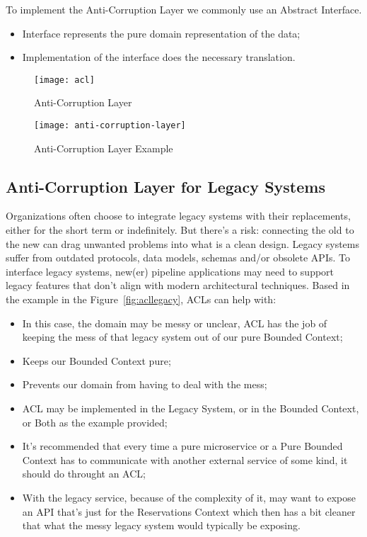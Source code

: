 To implement the Anti-Corruption Layer we commonly use an Abstract Interface.
\begin{itemize}
    \item Interface represents the pure domain representation of the data;
    \item Implementation of the interface does the necessary translation.
\end{itemize}

\begin{figure}[ht]
\caption{Anti-Corruption Layer}
\centering
\texttt{[image: acl]}
 \label{fig:acl}
\end{figure}


\begin{figure}[ht]
\caption{Anti-Corruption Layer Example}
\centering
\texttt{[image: anti-corruption-layer]}
 \label{fig:aclfull}
\end{figure}

\subsection{Anti-Corruption Layer for Legacy Systems}

Organizations often choose to integrate legacy systems with their replacements, either for the short term or indefinitely. But there's a risk: connecting the old to the new can drag unwanted problems into what is a clean design. Legacy systems suffer from outdated protocols, data models, schemas and/or obsolete APIs. To interface legacy systems, new(er) pipeline applications may need to support legacy features that don't align with modern architectural techniques. Based in the example in the Figure~\ref{fig:acllegacy}, ACLs can help with:
\begin{itemize}
    \item In this case, the domain may be messy or unclear, ACL has the job of keeping the mess of that legacy system out of our pure Bounded Context;
    \item Keeps our Bounded Context pure;
    \item Prevents our domain from having to deal with the mess;
    \item ACL may be implemented in the Legacy System, or in the Bounded Context, or Both as the example provided;
    \item It's recommended that every time a pure microservice or a Pure Bounded Context has to communicate with another external service of some kind, it should do throught an ACL;
    \item With the legacy service, because of the complexity of it, may want to expose an API that's just for the Reservations Context which then has a bit cleaner that what the messy legacy system would typically be exposing.
\end{itemize}

